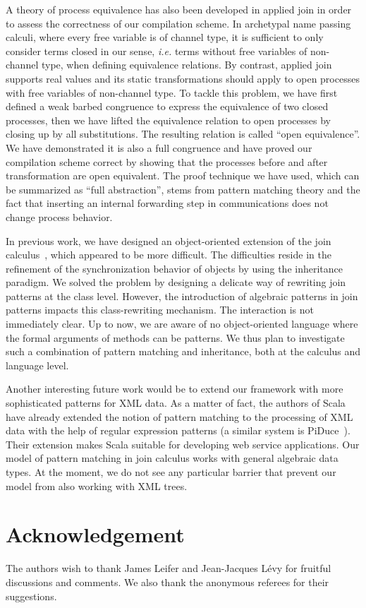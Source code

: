 \documentclass{LMCS}
\makeatletter
\newcommand{\ie}{\emph{i.e.}\@\xspace}
\newcommand{\scala}{\textrm{Scala}\xspace}
\renewcommand{\_}{\mathord{\rule[-.25ex]{1ex}{.15ex}}}
\makeatother
\begin{document}
A theory of process equivalence has also been developed in applied
join in order to assess the correctness of our compilation scheme. In
archetypal name passing calculi, where every free variable is of
channel type, it is sufficient to only consider terms closed in our
sense, \ie terms without free variables of non-channel type, when
defining equivalence relations. By contrast, applied join supports
real values and its static transformations should apply to open
processes with free variables of non-channel type.  To tackle this
problem, we have first defined a weak barbed congruence to express the
equivalence of two closed processes, then we have lifted the
equivalence relation to open processes by closing up by all
substitutions. The resulting relation is called ``open equivalence''.
We have demonstrated it is also a full congruence and have proved our
compilation scheme correct by showing that the processes before and
after transformation are open equivalent.  The proof technique we have
used, which can be summarized as ``full abstraction'', stems from
pattern matching theory and the fact that inserting an internal
forwarding step in communications does not change process behavior.

In previous work, we have designed an object-oriented extension of the
join
calculus~\cite{FournetLaneve03,MaMaranget2003type,MaMaranget2005hideTR},
which appeared to be more difficult. The difficulties reside in the
refinement of the synchronization behavior of objects by using the
inheritance paradigm. We solved the problem by designing a delicate
way of rewriting join patterns at the class level.  However, the
introduction of algebraic patterns in join patterns impacts this
class-rewriting mechanism. The interaction is not immediately clear.
Up to now, we are aware of no object-oriented language where the
formal arguments of methods can be patterns. We thus plan to
investigate such a combination of pattern matching and inheritance,
both at the calculus and language level.

Another interesting future work would be to extend our framework with
more sophisticated patterns for XML data. As a matter of fact, the
authors of \scala have already extended the notion of pattern matching
to the processing of XML data with the help of regular expression
patterns (a similar system is \textrm{PiDuce}~\cite{PiDuce:2005}).  Their
extension makes \scala suitable for developing web service
applications. Our model of pattern matching in join calculus works
with general algebraic data types. At the moment, we do not see any
particular barrier that prevent our model from also working with XML
trees.


\section*{Acknowledgement}
The authors wish to thank James Leifer and Jean-Jacques L\'{e}vy for
fruitful discussions and comments.
We also thank the anonymous referees for their suggestions.



\end{document}
